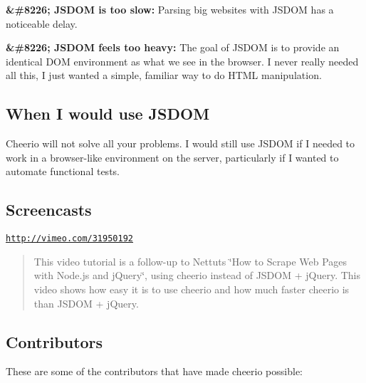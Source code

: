 {\bfseries \&\#8226; J\+S\+D\+OM is too slow\+:} Parsing big websites with J\+S\+D\+OM has a noticeable delay.

{\bfseries \&\#8226; J\+S\+D\+OM feels too heavy\+:} The goal of J\+S\+D\+OM is to provide an identical D\+OM environment as what we see in the browser. I never really needed all this, I just wanted a simple, familiar way to do H\+T\+ML manipulation.

\subsection*{When I would use J\+S\+D\+OM}

Cheerio will not solve all your problems. I would still use J\+S\+D\+OM if I needed to work in a browser-\/like environment on the server, particularly if I wanted to automate functional tests.

\subsection*{Screencasts}

\href{http://vimeo.com/31950192}{\tt http\+://vimeo.\+com/31950192}

\begin{quote}
This video tutorial is a follow-\/up to Nettut\textquotesingle{}s \char`\"{}\+How to Scrape Web Pages with Node.\+js and j\+Query\char`\"{}, using cheerio instead of J\+S\+D\+OM + j\+Query. This video shows how easy it is to use cheerio and how much faster cheerio is than J\+S\+D\+OM + j\+Query. \end{quote}


\subsection*{Contributors}

These are some of the contributors that have made cheerio possible\+:


